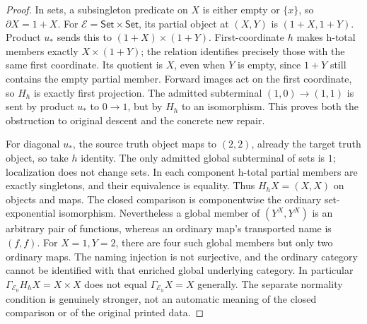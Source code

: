 \begin{proof}
In sets, a subsingleton predicate on \(X\) is either empty or
\(\{x\}\), so \(\partial X=1+X\). For
\(\mathcal E=\mathsf{Set}\times\mathsf{Set}\), its partial
object at \((X,Y)\) is \((1+X,1+Y)\). Product \(u_*\)
sends this to \((1+X)\times(1+Y)\). First-coordinate \(h\)
makes h-total members exactly \(X\times(1+Y)\); the relation
identifies precisely those with the same first coordinate. Its quotient
is \(X\), even when \(Y\) is empty, since \(1+Y\) still
contains the empty partial member. Forward images act on the first
coordinate, so \(H_h\) is exactly first projection. The admitted
subterminal \((1,0)\to(1,1)\) is sent by product \(u_*\)
to \(0\to1\), but by \(H_h\) to an isomorphism. This proves
both the obstruction to original descent and the concrete new repair.

For diagonal \(u_*\), the source truth object maps to \((2,2)\),
already the target truth object, so take \(h\) identity. The only
admitted global subterminal of sets is \(1\); localization does
not change sets. In each component h-total partial members are exactly
singletons, and their equivalence is equality. Thus \(H_hX=(X,X)\)
on objects and maps. The closed comparison is componentwise the ordinary
set-exponential isomorphism. Nevertheless a global member of
\((Y^X,Y^X)\) is an arbitrary pair of functions, whereas an ordinary
map's transported name is \((f,f)\). For \(X=1,Y=2\), there
are four such global members but only two ordinary maps. The naming
injection is not surjective, and the ordinary category cannot be
identified with that enriched global underlying category. In particular
\(\Gamma_{\mathcal E_0}H_hX=X\times X\) does not equal
\(\Gamma_{\mathcal E_h}X=X\) generally. The separate normality
condition is genuinely stronger, not an automatic meaning of the closed
comparison or of the original printed data.
\end{proof}


